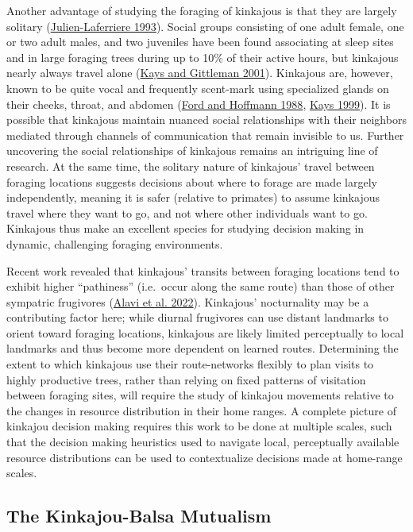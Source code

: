 \documentclass[twoside,12pt,final]{ucthesis-CA2012}
\begin{document}
\begin{ucmainmatter}
Another advantage of studying the foraging of kinkajous is that they are largely solitary (\protect\hyperlink{ref-julien-laferriere1993}{Julien-Laferriere 1993}). Social groups consisting of one adult female, one or two adult males, and two juveniles have been found associating at sleep sites and in large foraging trees during up to 10\% of their active hours, but kinkajous nearly always travel alone (\protect\hyperlink{ref-kays2001}{Kays and Gittleman 2001}). Kinkajous are, however, known to be quite vocal and frequently scent-mark using specialized glands on their cheeks, throat, and abdomen (\protect\hyperlink{ref-ford1988}{Ford and Hoffmann 1988}, \protect\hyperlink{ref-kays1999a}{Kays 1999}). It is possible that kinkajous maintain nuanced social relationships with their neighbors mediated through channels of communication that remain invisible to us. Further uncovering the social relationships of kinkajous remains an intriguing line of research. At the same time, the solitary nature of kinkajous' travel between foraging locations suggests decisions about where to forage are made largely independently, meaning it is safer (relative to primates) to assume kinkajous travel where they want to go, and not where other individuals want to go. Kinkajous thus make an excellent species for studying decision making in dynamic, challenging foraging environments.

Recent work revealed that kinkajous' transits between foraging locations tend to exhibit higher ``pathiness'' (i.e.~occur along the same route) than those of other sympatric frugivores (\protect\hyperlink{ref-alavi2022}{Alavi et al. 2022}). Kinkajous' nocturnality may be a contributing factor here; while diurnal frugivores can use distant landmarks to orient toward foraging locations, kinkajous are likely limited perceptually to local landmarks and thus become more dependent on learned routes. Determining the extent to which kinkajous use their route-networks flexibly to plan visits to highly productive trees, rather than relying on fixed patterns of visitation between foraging sites, will require the study of kinkajou movements relative to the changes in resource distribution in their home ranges. A complete picture of kinkajou decision making requires this work to be done at multiple scales, such that the decision making heuristics used to navigate local, perceptually available resource distributions can be used to contextualize decisions made at home-range scales.

\hypertarget{the-kinkajou-balsa-mutualism}{%
\subsection{The Kinkajou-Balsa Mutualism}\label{the-kinkajou-balsa-mutualism}}


\end{ucmainmatter}
\end{document}
